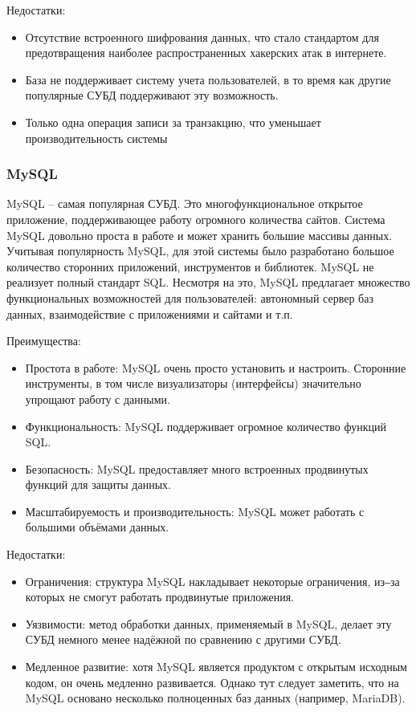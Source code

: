 \documentclass[a4paper,14pt]{extarticle}
\begin{document}
 	Недостатки:
 	
 	\begin{itemize}
 		\item Отсутствие встроенного шифрования данных, что стало стандартом для предотвращения наиболее распространенных хакерских атак в интернете.
 		\item База не поддерживает систему учета пользователей, в то время как другие популярные СУБД поддерживают эту возможность.
 		\item Только одна операция записи за транзакцию, что уменьшает производительность системы
 	\end{itemize}
 
 	\subsubsection{MySQL}
 	
 	MySQL – самая популярная СУБД. Это многофункциональное открытое приложение, поддерживающее работу огромного количества сайтов. Система MySQL довольно проста в работе и может хранить большие массивы данных. Учитывая популярность MySQL, для этой системы было разработано большое количество сторонних приложений, инструментов и библиотек. MySQL не реализует полный стандарт SQL. Несмотря на это, MySQL предлагает множество функциональных возможностей для пользователей: автономный сервер баз данных, взаимодействие с приложениями и сайтами и т.п. 
 	
 	Преимущества:
 	
 	\begin{itemize}
 		\item Простота в работе: MySQL очень просто установить и настроить. Сторонние инструменты, в том числе визуализаторы (интерфейсы) значительно упрощают работу с данными.
 		\item Функциональность: MySQL поддерживает огромное количество функций SQL\cite{sql}.
 		\item Безопасность: MySQL предоставляет много встроенных продвинутых функций для защиты данных.
 		\item Масштабируемость и производительность: MySQL может работать с большими объёмами данных. 
 	\end{itemize}
 
 	Недостатки:
 	
 	\begin{itemize}
 		\item Ограничения: структура MySQL накладывает некоторые ограничения, из‒за которых не смогут работать продвинутые приложения.
 		\item Уязвимости: метод обработки данных, применяемый в MySQL, делает эту СУБД немного менее надёжной по сравнению с другими СУБД.
 		\item Медленное развитие: хотя MySQL является продуктом с открытым исходным кодом, он очень медленно развивается. Однако тут следует заметить, что на MySQL основано несколько полноценных баз данных (например, MariaDB).
 	\end{itemize}
 
\end{document}
